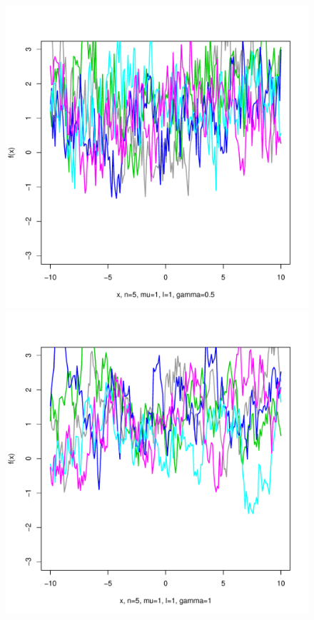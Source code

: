 \documentclass[12pt,letterpaper]{article}
\begin{document}
\begin{figure}
\begin{center}
\includegraphics[scale=0.2]{hw321/n5-m1-l1-g1.pdf}
\includegraphics[scale=0.2]{hw321/n5-m1-l1-g2.pdf}

\end{center}
\end{figure}
\end{document}
